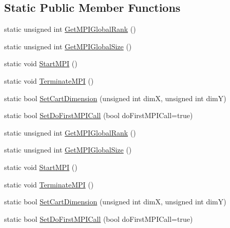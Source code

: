 \subsection*{Static Public Member Functions}
\begin{DoxyCompactItemize}
\item 
static unsigned int \mbox{\hyperlink{classROOT_1_1Minuit2_1_1MPIProcess_aa7c524a7980698bf9bba3a652e2f9a13}{Get\+M\+P\+I\+Global\+Rank}} ()
\item 
static unsigned int \mbox{\hyperlink{classROOT_1_1Minuit2_1_1MPIProcess_acfa3106122ad8f8c7d6bb3777c3d1ccc}{Get\+M\+P\+I\+Global\+Size}} ()
\item 
static void \mbox{\hyperlink{classROOT_1_1Minuit2_1_1MPIProcess_a235146d3dbd688de458e09425e546d96}{Start\+M\+PI}} ()
\item 
static void \mbox{\hyperlink{classROOT_1_1Minuit2_1_1MPIProcess_aa870a057a256be2d95fb7e9d03a9c298}{Terminate\+M\+PI}} ()
\item 
static bool \mbox{\hyperlink{classROOT_1_1Minuit2_1_1MPIProcess_a225f9dc66bcc0098c9f9ac0ec7c498b1}{Set\+Cart\+Dimension}} (unsigned int dimX, unsigned int dimY)
\item 
static bool \mbox{\hyperlink{classROOT_1_1Minuit2_1_1MPIProcess_ae4e6932bbb197c4bff1a17ed3a8b0670}{Set\+Do\+First\+M\+P\+I\+Call}} (bool do\+First\+M\+P\+I\+Call=true)
\item 
static unsigned int \mbox{\hyperlink{classROOT_1_1Minuit2_1_1MPIProcess_aa7c524a7980698bf9bba3a652e2f9a13}{Get\+M\+P\+I\+Global\+Rank}} ()
\item 
static unsigned int \mbox{\hyperlink{classROOT_1_1Minuit2_1_1MPIProcess_acfa3106122ad8f8c7d6bb3777c3d1ccc}{Get\+M\+P\+I\+Global\+Size}} ()
\item 
static void \mbox{\hyperlink{classROOT_1_1Minuit2_1_1MPIProcess_a235146d3dbd688de458e09425e546d96}{Start\+M\+PI}} ()
\item 
static void \mbox{\hyperlink{classROOT_1_1Minuit2_1_1MPIProcess_aa870a057a256be2d95fb7e9d03a9c298}{Terminate\+M\+PI}} ()
\item 
static bool \mbox{\hyperlink{classROOT_1_1Minuit2_1_1MPIProcess_a225f9dc66bcc0098c9f9ac0ec7c498b1}{Set\+Cart\+Dimension}} (unsigned int dimX, unsigned int dimY)
\item 
static bool \mbox{\hyperlink{classROOT_1_1Minuit2_1_1MPIProcess_ae4e6932bbb197c4bff1a17ed3a8b0670}{Set\+Do\+First\+M\+P\+I\+Call}} (bool do\+First\+M\+P\+I\+Call=true)
\end{DoxyCompactItemize}


